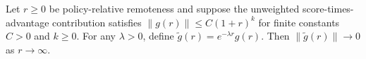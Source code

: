 \begin{proposition}
\label{prop:far-field}
Let $r\geq 0$ be policy-relative remoteness and suppose the unweighted
score-times-advantage contribution satisfies
$\lVert g(r)\rVert\leq C(1+r)^k$ for finite constants $C>0$ and $k\geq 0$.
For any $\lambda>0$, define $\widetilde g(r)=e^{-\lambda r}g(r)$.
Then $\lVert\widetilde g(r)\rVert\to 0$ as $r\to\infty$.
\end{proposition}
